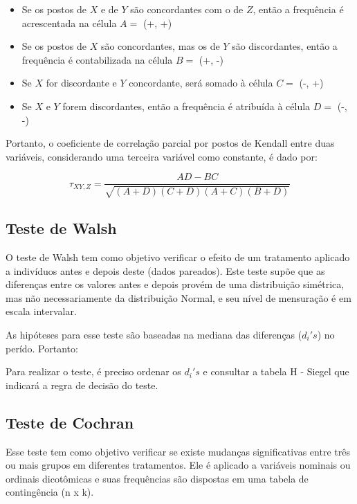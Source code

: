 \documentclass[
]{estat/estat}
\begin{document}
\begin{itemize}
    \item Se os postos de $X$ e de $Y$ são concordantes com o de $Z$, então a frequência é acrescentada na célula $A =$ (+, +)
    
    \item Se os postos de $X$ são concordantes, mas os de $Y$ são discordantes, então a frequência é contabilizada na célula $B =$ (+, -)
    
    \item Se $X$ for discordante e $Y$ concordante, será somado à célula $C =$ (-, +)
    
    \item Se $X$ e $Y$ forem discordantes, então a frequência é atribuída à célula $D =$ (-, -)
\end{itemize}

Portanto, o coeficiente de correlação parcial por postos de Kendall
entre duas variáveis, considerando uma terceira variável como constante,
é dado por:

\[ \tau_{XY, Z} = \frac{AD - BC}{\sqrt{(A + D)(C + D)(A + C)(B + D)}} \]

\subsection{Teste de Walsh}\label{teste-de-walsh}

O teste de Walsh tem como objetivo verificar o efeito de um tratamento
aplicado a indivíduos antes e depois deste (dados pareados). Este teste
supõe que as diferenças entre os valores antes e depois provém de uma
distribuição simétrica, mas não necessariamente da distribuição Normal,
e seu nível de mensuração é em escala intervalar.

As hipóteses para esse teste são baseadas na mediana das diferenças
(\(d_{i}'s\)) no perído. Portanto:


Para realizar o teste, é preciso ordenar os \(d_{i}'s\) e consultar a
tabela H - Siegel que indicará a regra de decisão do teste.

\subsection{Teste de Cochran}\label{teste-de-cochran}

Esse teste tem como objetivo verificar se existe mudanças significativas
entre três ou mais grupos em diferentes tratamentos. Ele é aplicado a
variáveis nominais ou ordinais dicotômicas e suas frequências são
dispostas em uma tabela de contingência (n x k).
\end{document}

